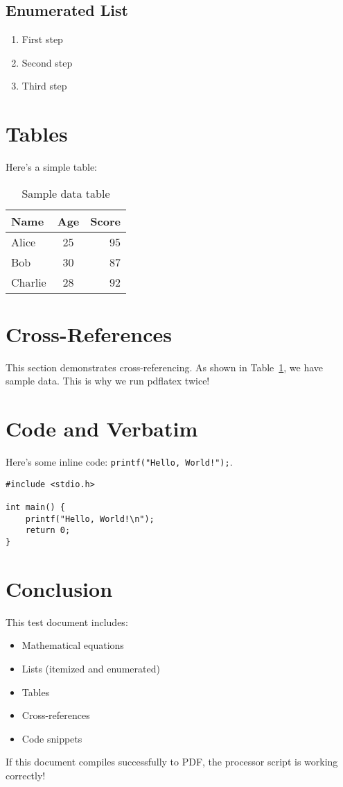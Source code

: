 \documentclass[12pt,a4paper]{article}
\begin{document}
\subsection{Enumerated List}
\begin{enumerate}
    \item First step
    \item Second step
    \item Third step
\end{enumerate}

\section{Tables}
Here's a simple table:

\begin{table}[h]
\centering
\begin{tabular}{|l|c|r|}
\hline
\textbf{Name} & \textbf{Age} & \textbf{Score} \\
\hline
Alice & 25 & 95 \\
Bob & 30 & 87 \\
Charlie & 28 & 92 \\
\hline
\end{tabular}
\caption{Sample data table}
\label{tab:sample}
\end{table}

\section{Cross-References}
This section demonstrates cross-referencing. As shown in Table~\ref{tab:sample}, we have sample data. This is why we run pdflatex twice!

\section{Code and Verbatim}
Here's some inline code: \texttt{printf("Hello, World!");}.

\begin{verbatim}
#include <stdio.h>

int main() {
    printf("Hello, World!\n");
    return 0;
}
\end{verbatim}

\section{Conclusion}
This test document includes:
\begin{itemize}
    \item Mathematical equations
    \item Lists (itemized and enumerated)
    \item Tables
    \item Cross-references
    \item Code snippets
\end{itemize}

If this document compiles successfully to PDF, the processor script is working correctly!
\end{document}
